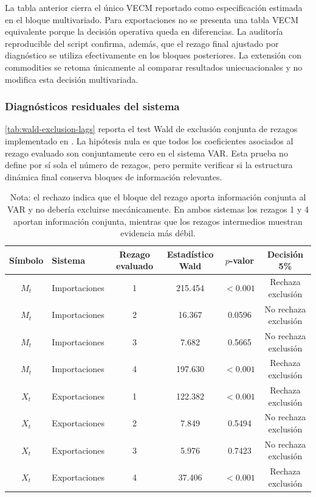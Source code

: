 \documentclass[11pt,a4paper]{article}
\begin{document}
	La tabla anterior cierra el único VECM reportado como especificación estimada
	en el bloque multivariado. Para exportaciones no se presenta una tabla VECM
	equivalente porque la decisión operativa queda en diferencias. La auditoría
	reproducible del script confirma, además, que el rezago final ajustado por
	diagnóstico se utiliza efectivamente en los bloques posteriores. La extensión
	con commodities se retoma únicamente al comparar resultados uniecuacionales y
	no modifica esta decisión multivariada.

	\subsubsection{Diagnósticos residuales del sistema}
	\label{subsubsec:diagnosticos-residuales-var}

	\autoref{tab:wald-exclusion-lags} reporta el test Wald de exclusión conjunta de
	rezagos implementado en . La hipótesis nula
	es que todos los coeficientes asociados al rezago evaluado son conjuntamente
	cero en el sistema VAR. Esta prueba no define por sí sola el número de rezagos,
	pero permite verificar si la estructura dinámica final conserva bloques de
	información relevantes.

	\begin{table}[H]
		\centering
		\caption{Test Wald de exclusión conjunta de rezagos VAR.}
		\label{tab:wald-exclusion-lags}
		\small
		\begin{tabular}{clcccc}
			\toprule
			Símbolo & Sistema & Rezago evaluado & Estadístico Wald & \(p\)-valor & Decisión 5\% \\
			\midrule
			\(M_t\) & Importaciones & 1 & 215.454 & \(<0.001\) & Rechaza exclusión \\
			\(M_t\) & Importaciones & 2 & 16.367 & 0.0596 & No rechaza exclusión \\
			\(M_t\) & Importaciones & 3 & 7.682 & 0.5665 & No rechaza exclusión \\
			\(M_t\) & Importaciones & 4 & 197.630 & \(<0.001\) & Rechaza exclusión \\
			\(X_t\) & Exportaciones & 1 & 122.382 & \(<0.001\) & Rechaza exclusión \\
			\(X_t\) & Exportaciones & 2 & 7.849 & 0.5494 & No rechaza exclusión \\
			\(X_t\) & Exportaciones & 3 & 5.976 & 0.7423 & No rechaza exclusión \\
			\(X_t\) & Exportaciones & 4 & 37.406 & \(<0.001\) & Rechaza exclusión \\
			\bottomrule
		\end{tabular}
		\caption*{\footnotesize Nota: el rechazo indica que el bloque del rezago aporta
			información conjunta al VAR y no debería excluirse mecánicamente. En ambos
			sistemas los rezagos 1 y 4 aportan información conjunta, mientras que los
			rezagos intermedios muestran evidencia más débil.}
	\end{table}
\end{document}
